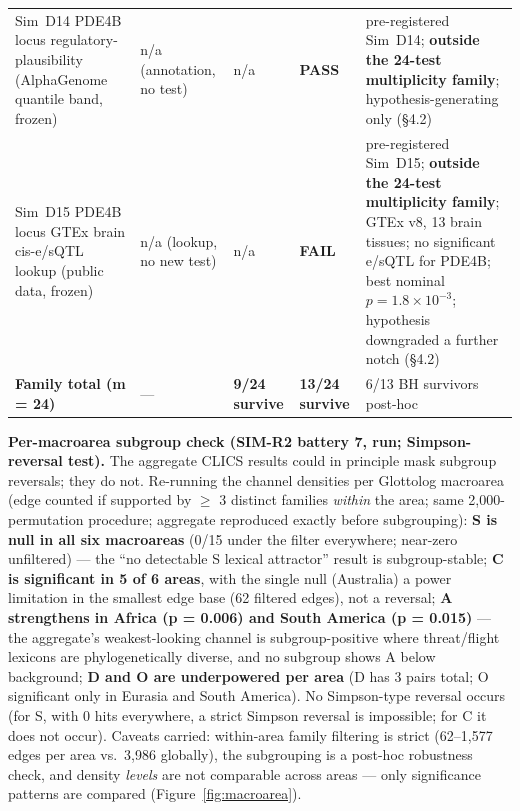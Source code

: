 \documentclass[11pt,twocolumn]{article}
\theoremstyle{plain}
\begin{document}
\begin{table}[t]
\begin{tabular}{@{}p{}p{}p{}p{}p{}@{}}
Sim~D14 PDE4B locus regulatory-plausibility (AlphaGenome quantile band, frozen) & n/a (annotation, no test) & n/a & \textbf{PASS} & pre-registered Sim~D14; \textbf{outside the 24-test multiplicity family}; hypothesis-generating only (\S{}4.2) \\
Sim~D15 PDE4B locus GTEx brain cis-e/sQTL lookup (public data, frozen) & n/a (lookup, no new test) & n/a & \textbf{FAIL} & pre-registered Sim~D15; \textbf{outside the 24-test multiplicity family}; GTEx v8, 13 brain tissues; no significant e/sQTL for PDE4B; best nominal $p = 1.8 \times 10^{-3}$; hypothesis downgraded a further notch (\S{}4.2) \\
\midrule
\textbf{Family total (m = 24)} & --- & \textbf{9/24 survive} & \textbf{13/24 survive} & 6/13 BH survivors post-hoc \\
\bottomrule
\end{tabular}
\end{table}

\textbf{Per-macroarea subgroup check (SIM-R2 battery 7, run; Simpson-reversal test).} The aggregate CLICS results could in principle mask subgroup reversals; they do not. Re-running the channel densities per Glottolog macroarea (edge counted if supported by \(\geq\) 3 distinct families \emph{within} the area; same 2,000-permutation procedure; aggregate reproduced exactly before subgrouping): \textbf{S is null in all six macroareas} (0/15 under the filter everywhere; near-zero unfiltered) --- the ``no detectable S lexical attractor'' result is subgroup-stable; \textbf{C is significant in 5 of 6 areas}, with the single null (Australia) a power limitation in the smallest edge base (62 filtered edges), not a reversal; \textbf{A strengthens in Africa (p = 0.006) and South America (p = 0.015)} --- the aggregate's weakest-looking channel is subgroup-positive where threat/flight lexicons are phylogenetically diverse, and no subgroup shows A below background; \textbf{D and O are underpowered per area} (D has 3 pairs total; O significant only in Eurasia and South America). No Simpson-type reversal occurs (for S, with 0 hits everywhere, a strict Simpson reversal is impossible; for C it does not occur). Caveats carried: within-area family filtering is strict (62--1,577 edges per area vs.\ 3,986 globally), the subgrouping is a post-hoc robustness check, and density \emph{levels} are not comparable across areas --- only significance patterns are compared (Figure~\ref{fig:macroarea}).
\end{document}
